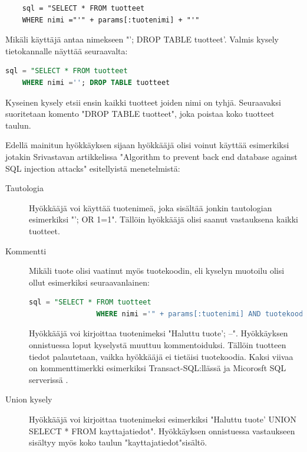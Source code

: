 \documentclass[finnish]{tktltiki2}
\theoremstyle{definition}
\theoremstyle{remark}
\begin{document}
	\begin{lstlisting}
	sql = "SELECT * FROM tuotteet
	WHERE nimi ="'" + params[:tuotenimi] + "'"
	\end{lstlisting}
	
	Mikäli käyttäjä antaa nimekseen "\space'; DROP TABLE tuotteet'. Valmis kysely tietokannalle näyttää seuraavalta:
	
	\begin{lstlisting}[language=sql]
	sql = "SELECT * FROM tuotteet
	WHERE nimi =''; DROP TABLE tuotteet     
	\end{lstlisting}
	
	Kyseinen kysely etsii ensin kaikki tuotteet joiden nimi on tyhjä. Seuraavaksi suoritetaan komento "DROP TABLE tuotteet", joka poistaa koko tuotteet taulun.
	
	 Edellä mainitun hyökkäyksen sijaan hyökkääjä olisi voinut käyttää esimerkiksi jotakin Srivastavan artikkelissa "Algorithm to prevent back end database against SQL injection attacks"\space \cite{piggy} esitellyistä menetelmistä:  
		\begin{description}
			
		\item[Tautologia] \hfill
		
		Hyökkääjä voi käyttää tuotenimeä, joka sisältää jonkin tautologian esimerkiksi "'; OR 1=1". Tällöin hyökkääjä olisi saanut vastauksena kaikki tuotteet.
		
		\item[Kommentti] \hfill
		
		Mikäli tuote olisi vaatinut myös tuotekoodin, eli kyselyn muotoilu olisi ollut esimerkiksi seuraavanlainen:
			\begin{lstlisting}[language=sql]
				sql = "SELECT * FROM tuotteet
				WHERE nimi ='" + params[:tuotenimi] AND tuotekoodi ='"params[:tuotekoodi]"'
			\end{lstlisting}
			Hyökkääjä voi kirjoittaa tuotenimeksi "Haluttu tuote'; --". Hyökkäyksen onnistuessa loput kyselystä muuttuu kommentoiduksi. Tällöin tuotteen tiedot palautetaan, vaikka hyökkääjä ei tietäisi tuotekoodia. Kaksi viivaa on kommenttimerkki esimerkiksi Transact-SQL:llässä ja Micorosft SQL serverissä \cite{sqlids}.
			
		\item[Union kysely] \hfill
		
		Hyökkääjä voi kirjoittaa tuotenimeksi esimerkiksi "Haluttu tuote' UNION SELECT * FROM kayttajatiedot". Hyökkäyksen onnistuessa vastaukseen sisältyy myös koko taulun "kayttajatiedot"\space sisältö.
	\end{description}
	
\end{document}
